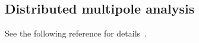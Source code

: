 \subsection{Distributed multipole analysis}
See the following reference for details~\cite{stone_distributed_2005}.